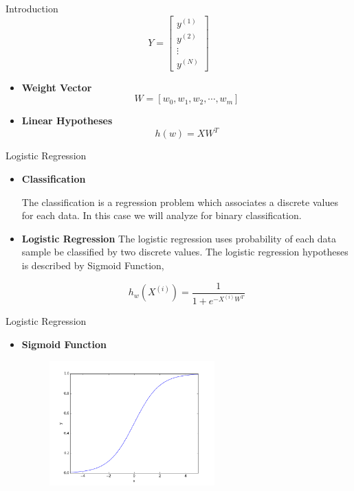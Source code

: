 \documentclass{beamer}
\begin{document}
\begin{frame}{Introduction} 
\begin{equation}
Y = \left[
\begin{array}{rrcrr}
y^{(1)}\\
y^{(2)}\\
\vdots \\
y^{(N)}
\end{array}
\right]
\end{equation}
\begin{itemize}
\item \textbf{Weight Vector}
\begin{equation}
W = \left[w_0, w_1, w_2, \cdots, w_m\right]
\end{equation}
\item \textbf{Linear Hypotheses }
\begin{equation}
h(w) = X W^T
\end{equation}

\end{itemize}
\end{frame}

\begin{frame}{Logistic Regression}
\begin{itemize}
	\item \textbf{Classification}
	
	The classification is a regression problem which associates a discrete values for each data. In this case we will analyze for binary classification. 
	\item \textbf{Logistic Regression}
	The logistic regression uses probability of each data sample be classified by two discrete values. The logistic regression hypotheses is described by Sigmoid Function,    
	
	\begin{equation}
	h_w(X^{(i)}) = \frac{1}{1 + e^{-X^{(i)}W^T}}
	\end{equation}
	

\end{itemize}
\end{frame}

\begin{frame}{Logistic Regression}
\begin{itemize}
\item \textbf{Sigmoid Function}

\begin{figure}
	\centering 
	\includegraphics[width=0.6\textwidth]{sigmoid.png}
\end{figure}
\end{itemize}
\end{frame}
\end{document}
